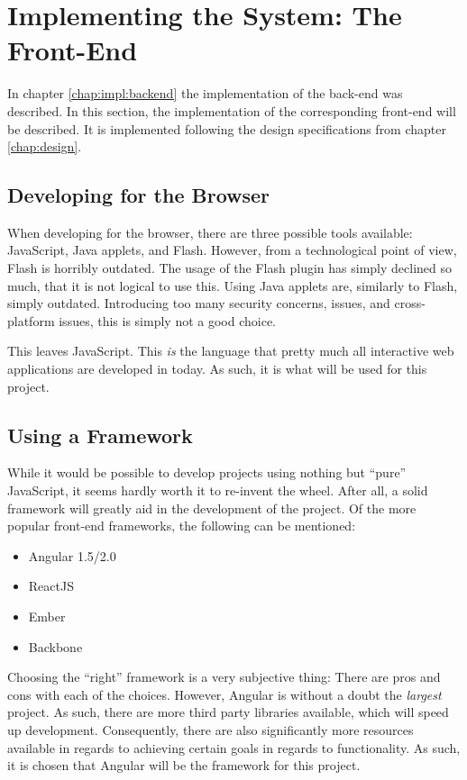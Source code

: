 \chapter{Implementing the System: The Front-End}
	In chapter \ref{chap:impl:backend} the implementation of the back-end was described. In this section, the implementation of the corresponding front-end will be described. It is implemented following the design specifications from chapter \ref{chap:design}.

	\section{Developing for the Browser}
		When developing for the browser, there are three possible tools available: JavaScript, Java applets, and Flash. However, from a technological point of view, Flash is horribly outdated. The usage of the Flash plugin has simply declined so much, that it is not logical to use this. Using Java applets are, similarly to Flash, simply outdated. Introducing too many security concerns, issues, and cross-platform issues, this is simply not a good choice.

		This leaves JavaScript. This \emph{is} the language that pretty much all interactive web applications are developed in today. As such, it is what will be used for this project.


	\section{Using a Framework}
		While it would be possible to develop projects using nothing but ``pure'' JavaScript, it seems hardly worth it to re-invent the wheel. After all, a solid framework will greatly aid in the development of the project. Of the more popular front-end frameworks, the following can be mentioned:
		\begin{itemize}
			\item Angular 1.5/2.0
			\item ReactJS
			\item Ember
			\item Backbone
		\end{itemize}
		Choosing the ``right'' framework is a very subjective thing: There are pros and cons with each of the choices. However, Angular is without a doubt the \emph{largest} project. As such, there are more third party libraries available, which will speed up development. Consequently, there are also significantly more resources available in regards to achieving certain goals in regards to functionality. As such, it is chosen that Angular will be the framework for this project.



